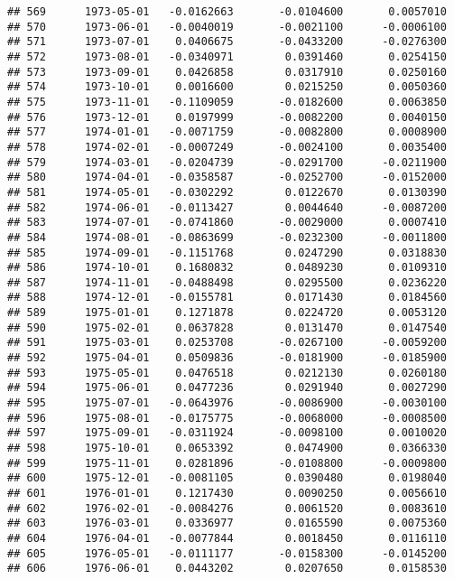\documentclass[
]{article}
\begin{document}
\begin{verbatim}
## 569      1973-05-01   -0.0162663       -0.0104600       0.0057010
## 570      1973-06-01   -0.0040019       -0.0021100      -0.0006100
## 571      1973-07-01    0.0406675       -0.0433200      -0.0276300
## 572      1973-08-01   -0.0340971        0.0391460       0.0254150
## 573      1973-09-01    0.0426858        0.0317910       0.0250160
## 574      1973-10-01    0.0016600        0.0215250       0.0050360
## 575      1973-11-01   -0.1109059       -0.0182600       0.0063850
## 576      1973-12-01    0.0197999       -0.0082200       0.0040150
## 577      1974-01-01   -0.0071759       -0.0082800       0.0008900
## 578      1974-02-01   -0.0007249       -0.0024100       0.0035400
## 579      1974-03-01   -0.0204739       -0.0291700      -0.0211900
## 580      1974-04-01   -0.0358587       -0.0252700      -0.0152000
## 581      1974-05-01   -0.0302292        0.0122670       0.0130390
## 582      1974-06-01   -0.0113427        0.0044640      -0.0087200
## 583      1974-07-01   -0.0741860       -0.0029000       0.0007410
## 584      1974-08-01   -0.0863699       -0.0232300      -0.0011800
## 585      1974-09-01   -0.1151768        0.0247290       0.0318830
## 586      1974-10-01    0.1680832        0.0489230       0.0109310
## 587      1974-11-01   -0.0488498        0.0295500       0.0236220
## 588      1974-12-01   -0.0155781        0.0171430       0.0184560
## 589      1975-01-01    0.1271878        0.0224720       0.0053120
## 590      1975-02-01    0.0637828        0.0131470       0.0147540
## 591      1975-03-01    0.0253708       -0.0267100      -0.0059200
## 592      1975-04-01    0.0509836       -0.0181900      -0.0185900
## 593      1975-05-01    0.0476518        0.0212130       0.0260180
## 594      1975-06-01    0.0477236        0.0291940       0.0027290
## 595      1975-07-01   -0.0643976       -0.0086900      -0.0030100
## 596      1975-08-01   -0.0175775       -0.0068000      -0.0008500
## 597      1975-09-01   -0.0311924       -0.0098100       0.0010020
## 598      1975-10-01    0.0653392        0.0474900       0.0366330
## 599      1975-11-01    0.0281896       -0.0108800      -0.0009800
## 600      1975-12-01   -0.0081105        0.0390480       0.0198040
## 601      1976-01-01    0.1217430        0.0090250       0.0056610
## 602      1976-02-01   -0.0084276        0.0061520       0.0083610
## 603      1976-03-01    0.0336977        0.0165590       0.0075360
## 604      1976-04-01   -0.0077844        0.0018450       0.0116110
## 605      1976-05-01   -0.0111177       -0.0158300      -0.0145200
## 606      1976-06-01    0.0443202        0.0207650       0.0158530

\end{verbatim}
\end{document}
